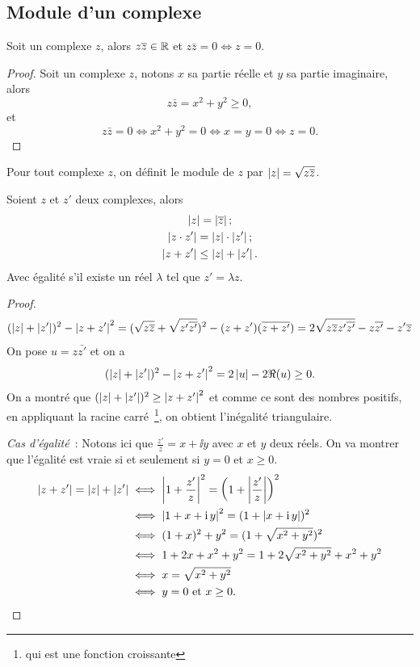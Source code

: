 \subsection{Module d'un complexe}
\label{subsec:modulecomplexe}
\begin{prop}
  Soit un complexe $z$, alors $z \overline{z} \in \mathbb{R}$ et $z \bar{z}=0 \iff z = 0$.
\end{prop}
\begin{proof}
  Soit un complexe $z$, notons $x$ sa partie réelle et $y$ sa partie imaginaire, alors
  \begin{equation}
    z \bar{z}=x^2+y^2 \geq 0,
  \end{equation}
  et
  \begin{equation}
    z \bar{z}=0 \iff x^2+y^2=0 \iff x=y=0 \iff z=0.
  \end{equation}
\end{proof}
%
\begin{defdef}
  Pour tout complexe $z$, on définit le module de $z$ par $\left\lvert z\right\rvert=\sqrt{z \overline{z}}$.
\end{defdef}
%
\begin{prop}
  Soient $z$ et $z'$ deux complexes, alors
  \begin{gather}
    \left\lvert z\right\rvert=\left\lvert\overline{z}\right\rvert; \\
    \left\lvert z \cdot z'\right\rvert=\left\lvert z\right\rvert \cdot \left\lvert z'\right\rvert; \\
    \left\lvert z+z'\right\rvert\leq\left\lvert z\right\rvert+\left\lvert z'\right\rvert.
  \end{gather}
  Avec égalité s'il existe un réel $\lambda$ tel que $z'=\lambda z$.
\end{prop}
\begin{proof}
  \begin{equation}
    (\left\lvert z\right\rvert+\left\lvert z'\right\rvert)^2-\left\lvert z+z'\right\rvert^2
    =(\sqrt{z \overline{z}} +\sqrt{z' \overline{z'}})^2 - (z+z')(\overline{z+z'})
    =2 \sqrt{z \overline{z} z' \overline{z'}} - z \overline{z'} - z'\overline{z}
  \end{equation}
  On pose $u=z \bar{z'}$ et on a
  \begin{equation}
    (\left\lvert z\right\rvert+\left\lvert z'\right\rvert)^2-\left\lvert z+z'\right\rvert^2=2 \left\lvert u\right\rvert-2 \Re(u) \geq 0.
  \end{equation}
  On a montré que $(\left\lvert z\right\rvert+\left\lvert z'\right\rvert)^2 \geq \left\lvert z+z'\right\rvert^2$ et comme ce sont des nombres positifs, en appliquant la racine carré~\footnote{qui est une fonction croissante}, on obtient l'inégalité triangulaire.

  \emph{Cas d'égalité}~: Notons ici que $\frac{z'}{z}=x + \ii y$ avec $x$ et $y$ deux réels. On va montrer que l'égalité est vraie si et seulement si $y=0$ et $x \geq 0$.
  \begin{align}
    \left\lvert z+z'\right\rvert=\left\lvert z\right\rvert+\left\lvert z'\right\rvert &\iff \left\lvert1+\frac{z'}{z}\right\rvert^2=\left(1+\left\lvert\frac{z'}{z}\right\rvert\right)^2 \\
    &\iff \left\lvert1+x+\operatorname{i} y\right\rvert^2 = (1+ \left\lvert x+ \operatorname{i} y\right\rvert)^2 \\
    &\iff (1+x)^2+y^2 = (1+\sqrt{x^2+y^2})^2 \\
    &\iff 1+2x+x^2+y^2 = 1 + 2\sqrt{x^2+y^2} + x^2+y^2 \\
    &\iff x = \sqrt{x^2+y^2}\\
    &\iff y=0 \text{~et~} x \geq 0.
  \end{align}
\end{proof}
